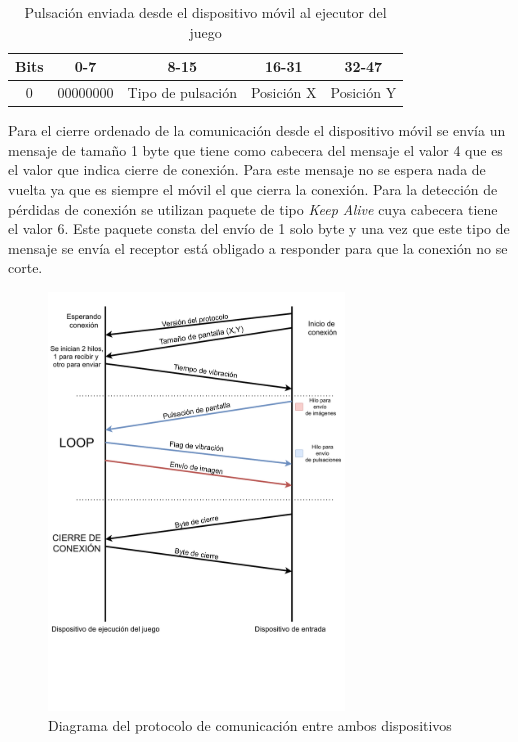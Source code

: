 \begin{table}[h!]
\centering
\begin{tabular}{|l|c|c|c|c|} 
\hline
Bits                    & 0-7               & 8-15                            & 16-31 & 32-47 \\ 
\hline
\multicolumn{1}{|c|}{0} & 00000000 & Tipo de pulsaci\'on & \multicolumn{1}{l|}{Posici\'on X} & \multicolumn{1}{l|}{Posici\'on Y}  \\
\hline
\end{tabular}
\caption{Pulsaci\'on enviada desde el dispositivo m\'ovil al ejecutor del juego}
\label{table:2}
\end{table}

Para el cierre ordenado de la comunicaci\'on desde el dispositivo m\'ovil se env\'ia un mensaje de tama\~no 1 byte que tiene como cabecera del mensaje el valor 4 que es el valor que indica cierre de conexi\'on. Para este mensaje no se espera nada de vuelta ya que es siempre el m\'ovil el que cierra la conexi\'on. Para la detecci\'on de p\'erdidas de conexi\'on se utilizan paquete de tipo \textit{Keep Alive} cuya cabecera tiene el valor 6. Este paquete consta del env\'io de 1 solo byte y una vez que este tipo de mensaje se env\'ia el receptor est\'a obligado a responder para que la conexi\'on no se corte.\\

\begin{figure}[h]

\centering
\includegraphics[width=0.7\textwidth]{./Imagenes/Vectorial/Arquitectura}
\caption{Diagrama del protocolo de comunicaci\'on entre ambos dispositivos}
\end{figure}

